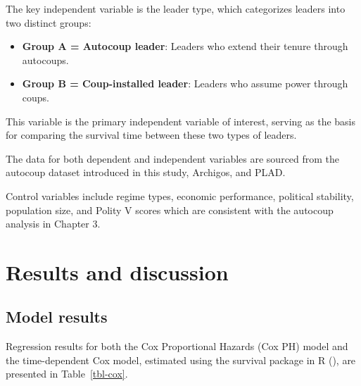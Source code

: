 \documentclass[
  12pt,
]{report}
\providecommand{\tightlist}{%
  \setlength{\itemsep}{0pt}\setlength{\parskip}{0pt}}
\begin{document}
The key independent variable is the leader type, which categorizes
leaders into two distinct groups:

\begin{itemize}
\tightlist
\item
  \textbf{Group A = Autocoup leader}: Leaders who extend their tenure
  through autocoups.
\item
  \textbf{Group B = Coup-installed leader}: Leaders who assume power
  through coups.
\end{itemize}

This variable is the primary independent variable of interest, serving
as the basis for comparing the survival time between these two types of
leaders.

The data for both dependent and independent variables are sourced from
the autocoup dataset introduced in this study, Archigos, and PLAD.

Control variables include regime types, economic performance, political
stability, population size, and Polity V scores which are consistent
with the autocoup analysis in Chapter 3.

\section{Results and discussion}\label{results-and-discussion}

\subsection{Model results}\label{model-results}

Regression results for both the Cox Proportional Hazards (Cox PH) model
and the time-dependent Cox model, estimated using the survival package
in R (), are presented in
Table~\ref{tbl-cox}.
\end{document}
